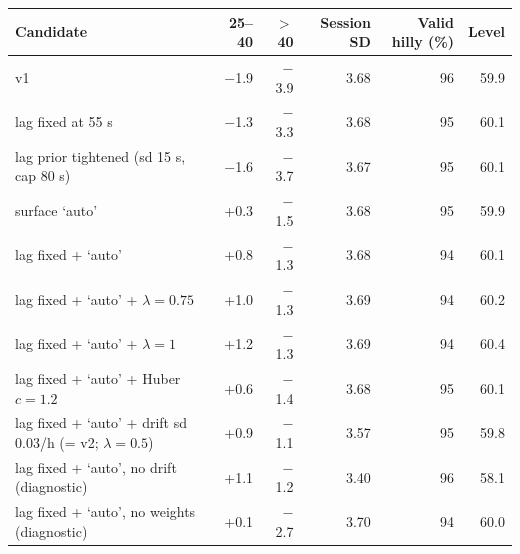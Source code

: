 \begin{tabular}{@{}lrrrrr@{}}
\toprule
Candidate & 25--40 & $>$40 & Session SD & Valid hilly (\%) & Level \\
\midrule
v1 & $-$1.9 & $-$3.9 & 3.68 & 96 & 59.9 \\
lag fixed at 55 s & $-$1.3 & $-$3.3 & 3.68 & 95 & 60.1 \\
lag prior tightened (sd 15 s, cap 80 s) & $-$1.6 & $-$3.7 & 3.67 & 95 & 60.1 \\
surface `auto' & +0.3 & $-$1.5 & 3.68 & 95 & 59.9 \\
lag fixed + `auto' & +0.8 & $-$1.3 & 3.68 & 94 & 60.1 \\
lag fixed + `auto' + $\lambda=0.75$ & +1.0 & $-$1.3 & 3.69 & 94 & 60.2 \\
lag fixed + `auto' + $\lambda=1$ & +1.2 & $-$1.3 & 3.69 & 94 & 60.4 \\
lag fixed + `auto' + Huber $c=1.2$ & +0.6 & $-$1.4 & 3.68 & 95 & 60.1 \\
lag fixed + `auto' + drift sd 0.03/h (= v2; $\lambda=0.5$) & +0.9 & $-$1.1 & 3.57 & 95 & 59.8 \\
lag fixed + `auto', no drift (diagnostic) & +1.1 & $-$1.2 & 3.40 & 96 & 58.1 \\
lag fixed + `auto', no weights (diagnostic) & +0.1 & $-$2.7 & 3.70 & 94 & 60.0 \\
\bottomrule
\end{tabular}